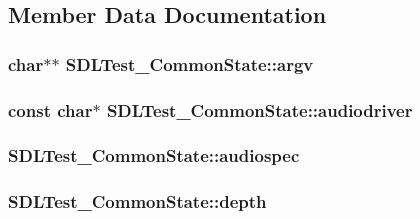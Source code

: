 \subsection{Member Data Documentation}
\hypertarget{struct_s_d_l_test___common_state_a6db840410b86ab7c6807763fd8bcb081}{
\subsubsection[{argv}]{\setlength{\rightskip}{0pt plus 5cm}char$\ast$$\ast$ S\-D\-L\-Test\-\_\-\-Common\-State\-::argv}}\label{struct_s_d_l_test___common_state_a6db840410b86ab7c6807763fd8bcb081}
\hypertarget{struct_s_d_l_test___common_state_ae51671cdec7979ca844f19b650b75300}{
\subsubsection[{audiodriver}]{\setlength{\rightskip}{0pt plus 5cm}const char$\ast$ S\-D\-L\-Test\-\_\-\-Common\-State\-::audiodriver}}\label{struct_s_d_l_test___common_state_ae51671cdec7979ca844f19b650b75300}
\hypertarget{struct_s_d_l_test___common_state_a2f73162e6bfe149141192fa49717d805}{
\subsubsection[{audiospec}]{ S\-D\-L\-Test\-\_\-\-Common\-State\-::audiospec}}\label{struct_s_d_l_test___common_state_a2f73162e6bfe149141192fa49717d805}
\hypertarget{struct_s_d_l_test___common_state_a6ab7d5f81b55c29594f9ba3e018632fe}{
\subsubsection[{depth}]{ S\-D\-L\-Test\-\_\-\-Common\-State\-::depth}}\label{struct_s_d_l_test___common_state_a6ab7d5f81b55c29594f9ba3e018632fe}

